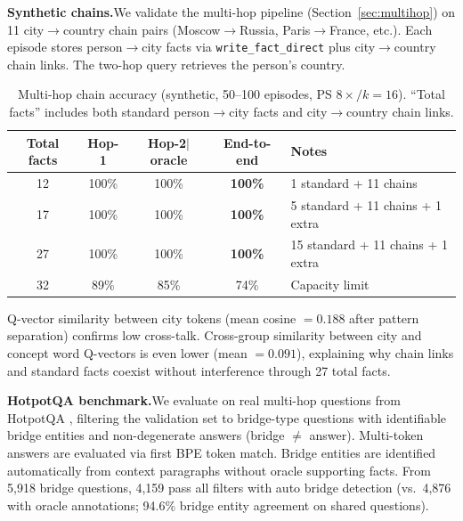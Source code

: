 \documentclass[11pt,a4paper]{article}
\begin{document}
\textbf{Synthetic chains.}\quad We validate the multi-hop pipeline (Section~\ref{sec:multihop}) on 11 city$\to$country chain pairs (Moscow$\to$Russia, Paris$\to$France, etc.). Each episode stores person$\to$city facts via \texttt{write\_fact\_direct} plus city$\to$country chain links. The two-hop query retrieves the person's country.

\begin{table}[t]
  \centering
  \caption{Multi-hop chain accuracy (synthetic, 50--100 episodes, PS $8\times/k{=}16$). ``Total facts'' includes both standard person$\to$city facts and city$\to$country chain links.}
  \label{tab:multihop_synthetic}
  \begin{tabular}{@{}ccccl@{}}
    \toprule
    Total facts & Hop-1 & Hop-2$|$oracle & End-to-end & Notes \\
    \midrule
    12 & 100\% & 100\% & \textbf{100\%} & 1 standard + 11 chains \\
    17 & 100\% & 100\% & \textbf{100\%} & 5 standard + 11 chains + 1 extra \\
    27 & 100\% & 100\% & \textbf{100\%} & 15 standard + 11 chains + 1 extra \\
    32 & 89\% & 85\% & 74\% & Capacity limit \\
    \bottomrule
  \end{tabular}
\end{table}

Q-vector similarity between city tokens (mean cosine $= 0.188$ after pattern separation) confirms low cross-talk. Cross-group similarity between city and concept word Q-vectors is even lower (mean $= 0.091$), explaining why chain links and standard facts coexist without interference through 27 total facts.

\textbf{HotpotQA benchmark.}\quad We evaluate on real multi-hop questions from HotpotQA \citep{yang2018hotpotqa}, filtering the validation set to bridge-type questions with identifiable bridge entities and non-degenerate answers (bridge $\neq$ answer). Multi-token answers are evaluated via first BPE token match. Bridge entities are identified automatically from context paragraphs without oracle supporting facts. From 5,918 bridge questions, 4,159 pass all filters with auto bridge detection (vs.\ 4,876 with oracle annotations; 94.6\% bridge entity agreement on shared questions).
\end{document}

